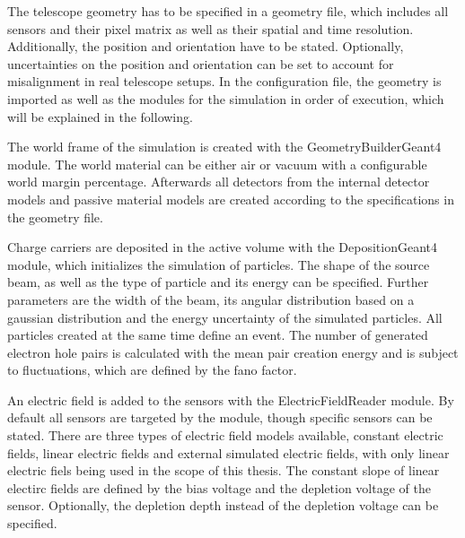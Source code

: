 The telescope geometry has to be specified in a geometry file, which includes all sensors and their pixel matrix as well as their spatial and time resolution. Additionally,
the position and orientation have to be stated. Optionally, uncertainties on the position and orientation can be set to account for misalignment in real telescope setups.
In the configuration file, the geometry is imported as well as the modules for the simulation in order of execution, which
will be explained in the following.

The world frame of the simulation is created with the GeometryBuilderGeant4 module. The world material can be either air or vacuum with a configurable world margin percentage.
Afterwards all detectors from the internal detector models and passive material models are created according to the specifications in the geometry file.

Charge carriers are deposited in the active volume with the DepositionGeant4 module, which initializes the simulation of particles. The shape of the source beam, as well
as the type of particle and its energy can be specified. Further parameters are the width of the beam, its angular distribution based on a gaussian distribution and the energy
uncertainty of the simulated particles. All particles created at the same time define an event. The number of generated electron hole pairs is calculated with the
mean pair creation energy and is subject to fluctuations, which are defined by the fano factor.

An electric field is added to the sensors with the ElectricFieldReader module. By default all sensors are targeted by the module, though specific sensors can be stated.
There are three types of electric field models available, constant electric fields, linear electric fields and external simulated electric fields, with only
linear electric fiels being used in the scope of this thesis. The constant slope of linear electirc fields are defined by the bias voltage and the
depletion voltage of the sensor. Optionally, the depletion depth instead of the depletion voltage can be specified.

